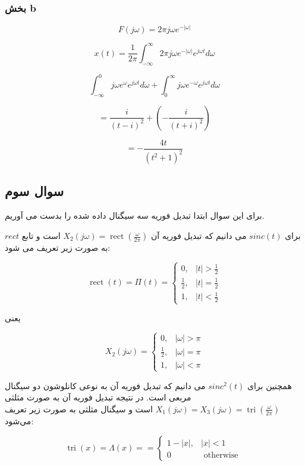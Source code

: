 \documentclass[12pt]{article}
\begin{document}
\subsubsection{بخش b}

$$F(j\omega) = 2\pi j \omega e^{-|\omega|}$$


$$x(t) =\frac{1}{2\pi}\int_{-\infty}^{\infty} 2\pi j \omega e^{-|\omega|} e^{j \omega t} d \omega$$

$$ \int_{-\infty}^{0} j\omega e^{\omega} e^{j \omega t} d\omega + \int_{0}^{\infty} j\omega e^{-\omega} e^{j\omega t} d\omega$$

$$=\frac{i}{(t-i)^2} +(-\frac{i}{(t+i)^2}) $$

$$=-\frac{4 t}{\left(t^2+1\right)^2}$$

\newpage
\subsection{سوال سوم}

برای این سوال ابتدا تبدیل فوریه سه سیگنال داده شده را بدست می آوریم.

برای $sinc(t)$ می دانیم که تبدیل فوریه آن
$
X_2(j\omega)= \operatorname{rect}(\frac{\omega}{2\pi})
$
است و تابع $rect$ به صورت زیر تعریف می شود:

$$ 
\operatorname{rect}(t)=\Pi(t)=\left\{\begin{array}{ll}
	0, & |t|>\frac{1}{2} \\
	\frac{1}{2}, & |t|=\frac{1}{2} \\
	1, & |t|<\frac{1}{2}
\end{array}\right.
$$

یعنی

$$X_2 (j\omega) = \left\{\begin{array}{ll}
	0, & |\omega|>\pi \\
	\frac{1}{2}, & |\omega|=\pi \\
	1, & |\omega|<\pi
\end{array}\right.$$

همچنین برای 
$sinc^2(t)$
می دانیم که تبدیل فوریه آن به نوعی کانلوشون دو سیگنال مربعی است. در نتیجه تبدیل فوریه آن به صورت مثلثی 
$X_1 (j\omega) = X_3(j\omega) =\operatorname{tri}(\frac{\omega}{2\pi})$
است و سیگنال مثلثی به صورت زیر تعریف می‌شود:

$$\operatorname{tri}(x) = \Lambda(x)=
=\left\{\begin{array}{ll}
	1-|x|, & |x|<1 \\
	0 & \text { otherwise }
\end{array}\right.
$$
\end{document}
